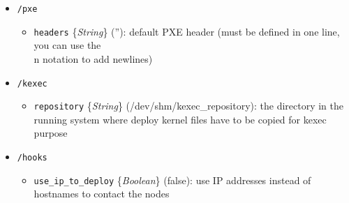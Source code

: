 \documentclass[a4wide,10pt,oneside]{book}
\newcommand{\ypath}[1]{\texttt{#1}}
\newcommand{\yfieldd}[3]{\texttt{#1} {\small\{{\emph{#2}}\}} {\small(}#3{\small)}:}
\begin{document}
\begin{itemize}
  \item \ypath{/pxe}
  \begin{itemize}
    \item \yfieldd{headers}{String}{''} default PXE header (must be defined in one line, you can use the \\n notation to add newlines)
  \end{itemize}

  \item \ypath{/kexec}
  \begin{itemize}
    \item \yfieldd{repository}{String}{/dev/shm/kexec\_repository} the directory in the running system where deploy kernel files have to be copied for kexec purpose
  \end{itemize}

  \item \ypath{/hooks}
  \begin{itemize}
    \item \yfieldd{use\_ip\_to\_deploy}{Boolean}{false} use IP addresses instead of hostnames to contact the nodes
  \end{itemize}


\end{itemize}
\end{document}
